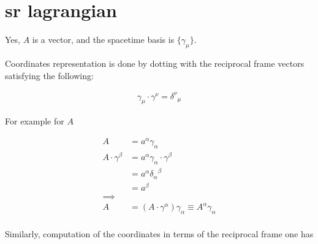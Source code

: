 
%

%
%


\chapter{sr lagrangian}
\label{chap:srLagrangianQ}
\date{ $RCSfile: srLagrangianQ.tex,v $ Last $Revision: 1.8 $ $Date: 2009/06/14 23:51:45 $ }





Yes, $A$ is a vector, and the spacetime basis is $\{\gamma_\mu\}$.

Coordinates representation is done by dotting with the reciprocal frame
vectors satisfying the following:

\begin{align*}
\gamma_\mu \cdot \gamma^\nu = {\delta^\nu}_\mu
\end{align*}

For example for $A$

\begin{align*}
A &= a^\alpha \gamma_\alpha \\
A \cdot \gamma^\beta
&= a^\alpha \gamma_\alpha \cdot \gamma^\beta \\
&= a^\alpha {\delta_\alpha}^\beta \\
&= a^\beta \\
\implies \\
A &= \left(A \cdot \gamma^\alpha\right) \gamma_\alpha \equiv A^\alpha \gamma_\alpha \\
\end{align*}

Similarly, computation of the coordinates in terms of the reciprocal frame
one has

